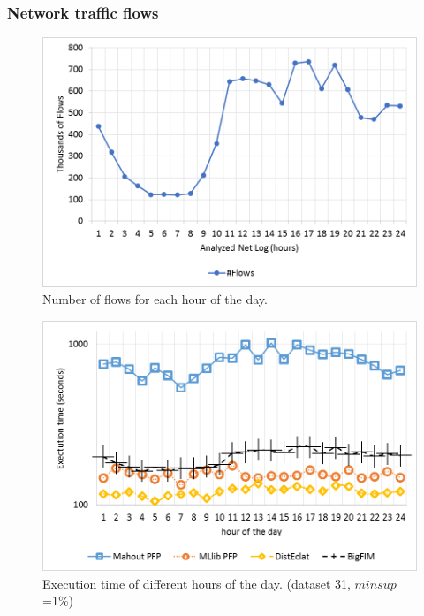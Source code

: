 \subsubsection{Network traffic flows}
\label{net_exp}


\begin{figure}[!t]
\includegraphics[width=5in]{chapters/survey/immagini/number_flows.png}
\caption{Number of flows for each hour of the day.}
\label{number_flows}
\end{figure}

\begin{figure}[!t]
\includegraphics[width=5in]{chapters/survey/immagini/net_logs_log.png}
\caption{Execution time of different hours of the day.
(dataset 31, $minsup$=1\%)}
\label{net}
\end{figure}


